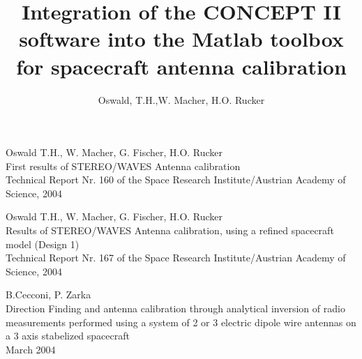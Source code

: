 \documentclass[a4paper,10pt]{article}
\title{Integration of the CONCEPT II software into the Matlab toolbox for spacecraft antenna calibration}
\author{Oswald, T.H.,W. Macher, H.O. Rucker}
\begin{document}
\maketitle
\newpage

\begin{abstract}

\end{abstract}

\newpage
\tableofcontents
\newpage




\begin{thebibliography}{999}
Oswald T.H., W. Macher, G. Fischer, H.O. Rucker\\
First results of STEREO/WAVES Antenna calibration\\
Technical Report Nr. 160 of the Space Research Institute/Austrian Academy of Science, 2004

Oswald T.H., W. Macher, G. Fischer, H.O. Rucker\\
Results of STEREO/WAVES Antenna calibration, using a refined spacecraft model (Design 1)\\
Technical Report Nr. 167 of the Space Research Institute/Austrian Academy of Science, 2004

 B.Cecconi, P. Zarka\\
Direction Finding and antenna calibration through analytical inversion of radio measurements performed using a system of 2 or 3 electric dipole wire antennas on a 3 axis stabelized spacecraft\\
March 2004

\end{thebibliography}

\newpage
\listoffigures
\newpage
\listoftables
\end{document}
